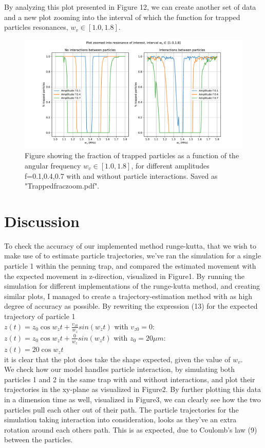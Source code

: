 \documentclass[english,notitlepage,reprint,nofootinbib,twocolumn]{article}
\begin{document}
By analyzing this plot presented in Figure 12, we can create another set of data and a new plot zooming into the interval of which the function for trapped particles resonances, $w_v \in [1.0 , 1.8]$.
\begin{figure}[H]
    \centering
    \includegraphics[width = .45\textwidth]{Trappedfraczoom.pdf} 
    \caption{Figure showing the fraction of trapped particles as a function of the angular frequency $w_v \in [1.0 , 1.8]$, for different amplitudes f=0.1,0.4,0.7 with and without particle interactions. Saved as "Trappedfraczoom.pdf".}
    \label{fig: ee251}
\end{figure} 




\section{Discussion}\label{sec:discussion}
To check the accuracy of our implemented method runge-kutta, that we wish to make use of to estimate particle trajectories, we've ran the simulation for a single particle 1 within the penning trap, and compared the estimated movement with the expected movement in z-direction, visualized in Figure1. By running the simulation for different implementations of the runge-kutta method, and creating similar plots, I managed to create a trajectory-estimation method with as high degree of accuracy as possible. By rewriting the expression (13) for the expected trajectory of particle 1 \\
$z(t)=z_0\cos{w_zt} + \frac{v_{z0}}{w_z}sin(w_zt)$ with $v_{z0}=0:$ \\
$z(t)=z_0\cos{w_zt} + \frac{0}{w_z}sin(w_zt)$ with $z_0=20 \mu m$:\\
$z(t)=20\cos{w_zt}$ \\
it is clear that the plot does take the shape expected, given the value of $w_v$. \\

We check how our model handles particle interaction, by simulating both particles 1 and 2 in the same trap with and without interactions, and plot their trajectories in the xy-plane as visualized in Figure2. By further plotting this data in a dimension time as well, visualized in Figure3, we can clearly see how the two particles pull each other out of their path. The particle trajectories for the simulation taking interaction into consideration, looks as they've an extra rotation around each others path. This is as expected, due to Coulomb's law (9) between the particles. \\
\end{document}
